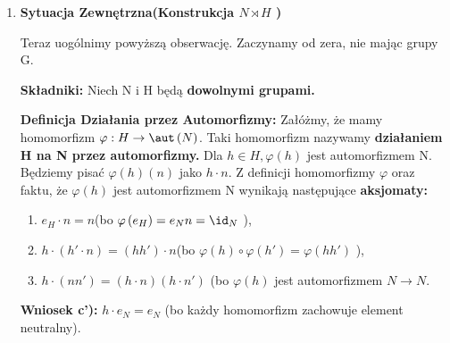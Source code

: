 \begin{goall}
\begin{enumerate}[label=\arabic*.]
\begin{figure}[H]
	\end{figure}

\vspace{3.5em}

\noindent\textbf{Wniosek(intuicja): } Ten rachunek pokazuje, że mnożenie w NH jest całkowicie zdeterminowane przez trzy operacje:
	\begin{enumerate}[label=\alph*)]
		\item Działanie w N(mnożenie $n_1 \text{ przez } \left( h_1\cdot n_2 \right) $,
		\item Działanie w H(mnożenie $h_1\text{ przez } h_2$),
		\item Działanie H na N(obliczenie $h_1\cdot n_2$ ).
	\end{enumerate}
\item \textbf{Sytuacja Zewnętrzna(Konstrukcja $N\rtimes H$ )}

	Teraz uogólnimy powyższą obserwację. Zaczynamy od zera, nie mając grupy G.

	\noindent\textbf{Składniki: } Niech N i H będą \textbf{dowolnymi grupami.}

	\noindent\textbf{Definicja Działania przez Automorfizmy: } Załóżmy, że mamy homomorfizm $\varphi: H \rightarrow \aut\left(N\right) $.
	Taki homomorfizm nazywamy \textbf{działaniem H na N przez automorfizmy.} Dla $h \in H, \varphi\left( h \right) $ jest automorfizmem N. Będziemy pisać $\varphi\left( h \right) \left( n \right) $ jako $h\cdot n$. Z definicji homomorfizmy $\varphi$ oraz faktu, że $\varphi\left( h \right) $ jest automorfizmem N wynikają następujące  \textbf{aksjomaty:}
	\begin{enumerate}[label=\alph*)]
		\item $e_{H} \cdot n = n$(bo $\varphi\left( e_{H} \right) = e_{N}n = \id_{N}$ ),
		\item $h\cdot \left( h' \cdot n \right) = \left( hh' \right) \cdot n$(bo $\varphi\left( h \right) \circ \varphi\left( h' \right) = \varphi\left( hh' \right) $ ),
		\item $h\cdot \left( nn' \right) = \left( h\cdot n \right) \left( h\cdot n' \right)$ (bo $\varphi\left( h \right)$ jest automorfizmem $N\rightarrow N$.
	\end{enumerate}
\textbf{Wniosek c'):} $h\cdot e_{N} = e_{N}$ (bo każdy homomorfizm zachowuje element neutralny). 


\end{enumerate}
\end{goall}
